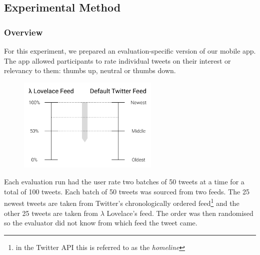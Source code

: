 \documentclass{article}
\begin{document}
\subsection{Experimental Method}
\subsubsection*{Overview} %
For this experiment, we prepared an evaluation-specific version of our mobile app. The app allowed participants to rate individual tweets on their interest or relevancy to them: thumbs up, neutral or thumbs down.

\begin{figure}[H]
    \includegraphics[width=0.6\textwidth, center]{evaluations_1}
\end{figure}


\newpage


\noindent Each evaluation run had the user rate two batches of 50 tweets at a time for a total of 100 tweets. Each batch of 50 tweets was sourced from two feeds. The 25 newest tweets are taken from Twitter's chronologically ordered feed\footnote{in the Twitter API this is referred to as the \textit{homeline}} and the other 25 tweets are taken from $\lambda$ Lovelace's feed. The order was then randomised so the evaluator did not know from which feed the tweet came.
\end{document}
